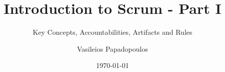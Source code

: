 \documentclass[aspectratio=169,xcolor=dvipsnames]{beamer}
\title[Introduction to Scrum - Part I]{Introduction to Scrum - Part I}
\subtitle{Key Concepts, Accountabilities, Artifacts and Rules}
\author{Vasileios Papadopoulos}
\institute[]{}
\date{\today}
\begin{document}
    \begin{frame}
    	\titlepage
    \end{frame}
    
    
    
    
    
    
    
    
    
    
\end{document}
